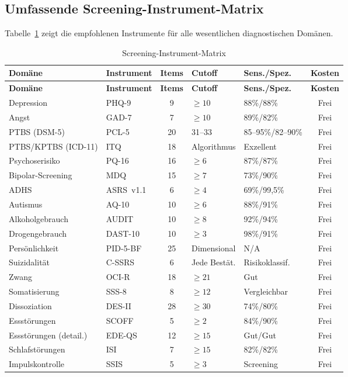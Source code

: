 \documentclass[11pt,a4paper]{article}
\begin{document}
\subsection{Umfassende Screening-Instrument-Matrix}

Tabelle~\ref{tab:instrumente} zeigt die empfohlenen Instrumente f\"ur alle wesentlichen diagnostischen Dom\"anen.

\begin{longtable}{p{2.5cm}p{2.3cm}cp{1.5cm}p{2.5cm}c}
\caption{Screening-Instrument-Matrix} \label{tab:instrumente} \\
\toprule
\textbf{Dom\"ane} & \textbf{Instrument} & \textbf{Items} & \textbf{Cutoff} & \textbf{Sens./Spez.} & \textbf{Kosten} \\
\midrule
\endfirsthead
\toprule
\textbf{Dom\"ane} & \textbf{Instrument} & \textbf{Items} & \textbf{Cutoff} & \textbf{Sens./Spez.} & \textbf{Kosten} \\
\midrule
\endhead
Depression & PHQ-9 & 9 & $\geq 10$ & 88\%/88\% & Frei \\
\addlinespace
Angst & GAD-7 & 7 & $\geq 10$ & 89\%/82\% & Frei \\
\addlinespace
PTBS (DSM-5) & PCL-5 & 20 & 31--33 & 85--95\%/82--90\% & Frei \\
\addlinespace
PTBS/KPTBS (ICD-11) & ITQ & 18 & Algorithmus & Exzellent & Frei \\
\addlinespace
Psychoserisiko & PQ-16 & 16 & $\geq 6$ & 87\%/87\% & Frei \\
\addlinespace
Bipolar-Screening & MDQ & 15 & $\geq 7$ & 73\%/90\% & Frei \\
\addlinespace
ADHS & ASRS~v1.1 & 6 & $\geq 4$ & 69\%/99,5\% & Frei \\
\addlinespace
Autismus & AQ-10 & 10 & $\geq 6$ & 88\%/91\% & Frei \\
\addlinespace
Alkoholgebrauch & AUDIT & 10 & $\geq 8$ & 92\%/94\% & Frei \\
\addlinespace
Drogengebrauch & DAST-10 & 10 & $\geq 3$ & 98\%/91\% & Frei \\
\addlinespace
Pers\"onlichkeit & PID-5-BF & 25 & Dimensional & N/A & Frei \\
\addlinespace
Suizidalit\"at & C-SSRS & 6 & Jede Best\"at. & Risikoklassif. & Frei \\
\addlinespace
Zwang & OCI-R & 18 & $\geq 21$ & Gut & Frei \\
\addlinespace
Somatisierung & SSS-8 & 8 & $\geq 12$ & Vergleichbar & Frei \\
\addlinespace
Dissoziation & DES-II & 28 & $\geq 30$ & 74\%/80\% & Frei \\
\addlinespace
Essst\"orungen & SCOFF & 5 & $\geq 2$ & 84\%/90\% & Frei \\
\addlinespace
Essst\"orungen (detail.) & EDE-QS & 12 & $\geq 15$ & Gut/Gut & Frei \\
\addlinespace
Schlafst\"orungen & ISI & 7 & $\geq 15$ & 82\%/82\% & Frei \\
\addlinespace
Impulskontrolle & SSIS & 5 & $\geq 3$ & Screening & Frei \\
\bottomrule
\end{longtable}
\end{document}
